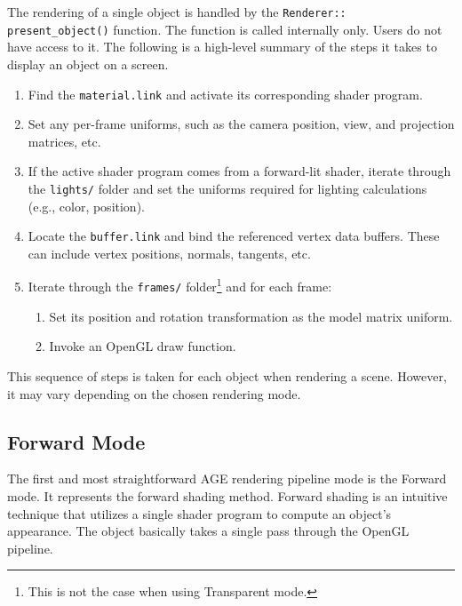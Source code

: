 \documentclass[
  digital,     %
  oneside,     %
  nosansbold,  %
  nocolorbold, %
  lof,         %
  lot,         %
]{fithesis4}
\begin{document}
The rendering of a single object is handled by the \verb|Renderer::|\\
\verb|present_object()| function.
The function is called internally only. Users do not have access to it.
The following is a high-level summary of the steps it takes to display an object on a screen.
\begin{enumerate}
    \item Find the \verb|material.link| and activate its corresponding shader program.
    
    \item Set any per-frame uniforms, such as the camera position,
    view, and projection matrices, etc.

    \item If the active shader program comes from a forward-lit shader, iterate through the \verb|lights/| folder
    and set the uniforms required for lighting calculations (e.g., color, position).

    \item Locate the \verb|buffer.link| and bind the referenced vertex data buffers. These
    can include vertex positions, normals, tangents, etc.

    \item Iterate through the \verb|frames/| folder\footnote{This is not the case when using Transparent mode.}
    and for each frame:

    \begin{enumerate}
        \item[5.1.] Set its position and rotation transformation as the model matrix uniform.
        
        \item[5.2.] Invoke an OpenGL draw function.
    \end{enumerate}
\end{enumerate}
This sequence of steps is taken for each object when rendering a scene. However, it may vary depending
on the chosen rendering mode.

\subsection{Forward Mode}
The first and most straightforward AGE rendering pipeline mode is the Forward mode. It represents the forward shading method.
Forward shading is an intuitive technique that utilizes a single
shader program to compute an object's appearance. The object basically takes a single pass through the OpenGL pipeline.
\end{document}
